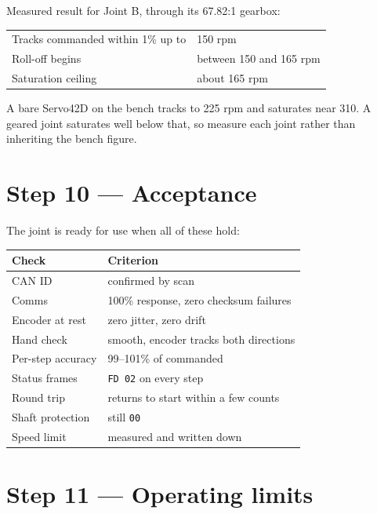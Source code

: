 \documentclass[11pt,letterpaper]{article}
\begin{document}
Measured result for Joint B, through its 67.82:1 gearbox:

\begin{center}
\begin{tabular}{ll}
\toprule
Tracks commanded within 1\% up to & 150 rpm \\
Roll-off begins                   & between 150 and 165 rpm \\
Saturation ceiling                & about 165 rpm \\
\bottomrule
\end{tabular}
\end{center}

A bare Servo42D on the bench tracks to 225 rpm and saturates near 310. A geared
joint saturates well below that, so measure each joint rather than inheriting the
bench figure.

\section*{Step 10 --- Acceptance}

The joint is ready for use when all of these hold:

\begin{center}
\begin{tabular}{ll}
\toprule
\textbf{Check} & \textbf{Criterion} \\ \midrule
CAN ID            & confirmed by scan \\
Comms             & 100\% response, zero checksum failures \\
Encoder at rest   & zero jitter, zero drift \\
Hand check        & smooth, encoder tracks both directions \\
Per-step accuracy & 99--101\% of commanded \\
Status frames     & \texttt{FD 02} on every step \\
Round trip        & returns to start within a few counts \\
Shaft protection  & still \texttt{00} \\
Speed limit       & measured and written down \\
\bottomrule
\end{tabular}
\end{center}

\section*{Step 11 --- Operating limits}
\end{document}
